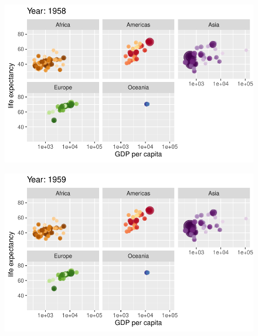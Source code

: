 \documentclass[
  letterpaper,
  DIV=11,
  numbers=noendperiod]{scrartcl}
\begin{document}
\begin{figure}[H]

{\centering \includegraphics{class05_files/figure-pdf/unnamed-chunk-24-12.pdf}

}

\end{figure}

\begin{figure}[H]

{\centering \includegraphics{class05_files/figure-pdf/unnamed-chunk-24-13.pdf}

}

\end{figure}
\end{document}
